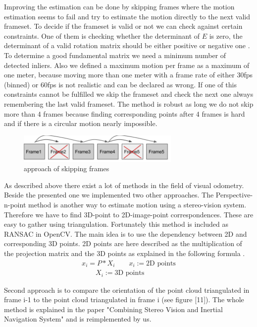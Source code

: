 \documentclass[11pt]{article}
\begin{document}
	Improving the estimation can be done by skipping frames where the motion estimation seems to fail and try to estimate the motion directly to the next valid frameset. To decide if the frameset is valid or not we can check against certain constraints. One of them is checking whether the determinant of $E$ is zero, the determinant of a valid rotation matrix should be either positive or negative one \cite{ValidEssential}. To determine a good fundamental matrix we need a minimum number of detected inliers. Also we defined a maximum motion per frame as a maximum of one meter, because moving more than one meter with a frame rate of either 30fps (binned) or 60fps is not realistic and can be declared as wrong. If one of this constraints cannot be fulfilled we skip the frameset and check the next one always remembering the last valid frameset. The method is robust as long we do not skip more than 4 frames because finding corresponding points after 4 frames is hard and if there is a circular motion nearly impossible. 

	\begin{figure}[H]
		\centering
		\includegraphics[width=0.7\textwidth]{images/skipFrames.png}
		\caption{approach of skipping frames}
	\end{figure}
	
	As described above there exist a lot of methods in the field of visual odometry. Beside the presented one we implemented two other approaches.
	The Perspective-n-point method is another way to estimate motion using a stereo-vision system. Therefore we have to find 3D-point to 2D-image-point correspondences. These are easy to gather using triangulation. Fortunately this method is included as RANSAC in OpenCV. The main idea is to use the dependency between 2D and corresponding 3D points. 2D points are here described as the multiplication of the projection matrix and the 3D points as explained in the following formula \cite{PnP}.
	\begin{align}
	  x_i = P * X_i \qquad x_i := \text{2D points} \\
	  \qquad X_i := \text{3D points} \nonumber
	\end{align}
	
	Second approach is to compare the orientation of the point cloud triangulated in frame i-1 to the point cloud triangulated in frame i (see figure [11]).
	The whole method is explained in the paper "Combining Stereo Vision and Inertial Navigation System" \cite{cloudOrientation} and is reimplemented by us.
\end{document}
